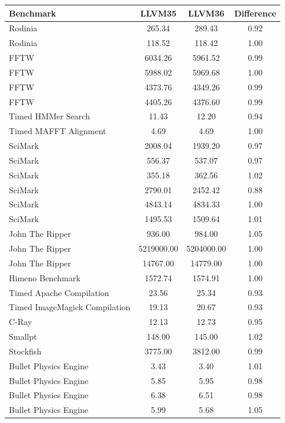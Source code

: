 \begin{appendix}
\begin{table}[htbp]
    \centering
    \begin{longtable}{l|c|c|c}
        \hline
        Benchmark & LLVM35 & LLVM36 & Difference \\
        \hline
        Rodinia & 265.34 & 289.43 & 0.92 \\
        Rodinia & 118.52 & 118.42 & 1.00 \\
        FFTW & 6034.26 & 5961.52 & 0.99 \\
        FFTW & 5988.02 & 5969.68 & 1.00 \\
        FFTW & 4373.76 & 4349.26 & 0.99 \\
        FFTW & 4405.26 & 4376.60 & 0.99 \\
        Timed HMMer Search & 11.43 & 12.20 & 0.94 \\
        Timed MAFFT Alignment & 4.69 & 4.69 & 1.00 \\
        SciMark & 2008.04 & 1939.20 & 0.97 \\
        SciMark & 556.37 & 537.07 & 0.97 \\
        SciMark & 355.18 & 362.56 & 1.02 \\
        SciMark & 2790.01 & 2452.42 & 0.88 \\
        SciMark & 4843.14 & 4834.33 & 1.00 \\
        SciMark & 1495.53 & 1509.64 & 1.01 \\
        John The Ripper & 936.00 & 984.00 & 1.05 \\
        John The Ripper & 5219000.00 & 5204000.00 & 1.00 \\
        John The Ripper & 14767.00 & 14779.00 & 1.00 \\
        Himeno Benchmark & 1572.74 & 1574.91 & 1.00 \\
        Timed Apache Compilation & 23.56 & 25.34 & 0.93 \\
        Timed ImageMagick Compilation & 19.13 & 20.67 & 0.93 \\
        C-Ray & 12.13 & 12.73 & 0.95 \\
        Smallpt & 148.00 & 145.00 & 1.02 \\
        Stockfish & 3775.00 & 3812.00 & 0.99 \\
        Bullet Physics Engine & 3.43 & 3.40 & 1.01 \\
        Bullet Physics Engine & 5.85 & 5.95 & 0.98 \\
        Bullet Physics Engine & 6.38 & 6.51 & 0.98 \\
        Bullet Physics Engine & 5.99 & 5.68 & 1.05 \\

\end{longtable}
\end{table}
\end{appendix}
